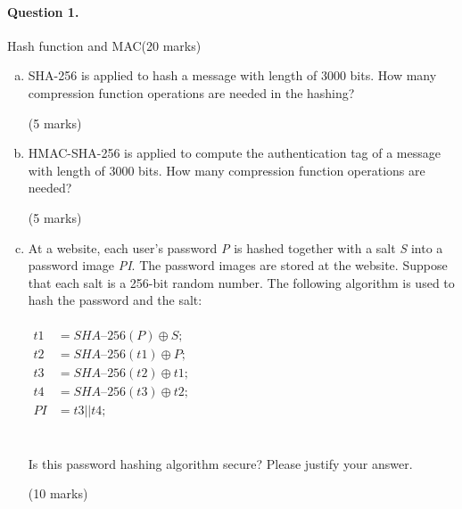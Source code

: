 \documentclass[12pt]{article}
\begin{document}
\paragraph{Question 1.}   Hash function and MAC\hfill (20 marks)
\begin{enumerate}[(a)]
\itemsep 0em
    \item SHA-256 is applied to hash a message with length of 3000 bits. How many compression function operations are needed in the hashing?{\vspace{-0.5em}\begin{flushright} (5 marks)\end{flushright}}
    \item HMAC-SHA-256 is applied to compute the authentication tag of a message with length of 3000 bits. How many compression function operations are needed?{\vspace{-0.5em}\begin{flushright} (5 marks)\end{flushright}}
    \item At a website, each user's password \textit{P} is hashed together with a salt \textit{S} into a password image \textit{PI}. The password images are stored at the website. Suppose that each salt is a 256-bit random number. The following algorithm is used to hash the password and the salt:\\\\$\begin{aligned}
    t1&=\textit{SHA--}256(P)\oplus S;\\
    t2&=\textit{SHA--}256(t1)\oplus P;\\
    t3&=\textit{SHA--}256(t2)\oplus t1;
\\
t4&=\textit{SHA--}256(t3)\oplus t2;\\
PI&=t3||t4;
    \end{aligned}$\\\\\\
    Is this password hashing algorithm secure? Please justify your answer.{\vspace{-0.5em}\begin{flushright} (10 marks)\end{flushright}}
\end{enumerate}
\end{document}
